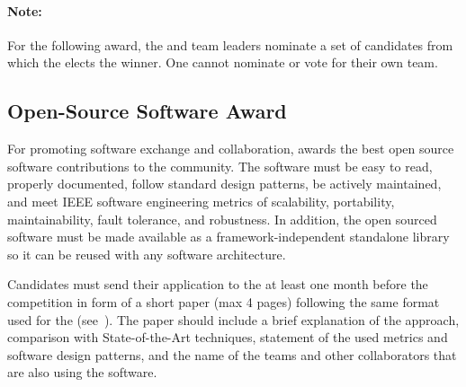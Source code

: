 \paragraph*{Note: } For the following award, the \TC{} and team leaders nominate a set of candidates from which the \EC{} elects the winner. One cannot nominate or vote for their own team.

\subsection{Open-Source Software Award}
\label{sec:introduction:assaward}
For promoting software exchange and collaboration, \RoboCup\AtHome{} awards the best open source software contributions to the community. The software must be easy to read, properly documented, follow standard design patterns, be actively maintained, and meet IEEE software engineering metrics of scalability, portability, maintainability, fault tolerance, and robustness. In addition, the open sourced software must be made available as a framework-independent standalone library so it can be reused with any software architecture.

Candidates must send their application to the \TC{} at least one month before the competition in form of a short paper (max 4 pages) following the same format used for the \TDP{} (see~). The paper should include a brief explanation of the approach, comparison with State-of-the-Art techniques, statement of the used metrics and software design patterns, and the name of the teams and other collaborators that are also using the software.

